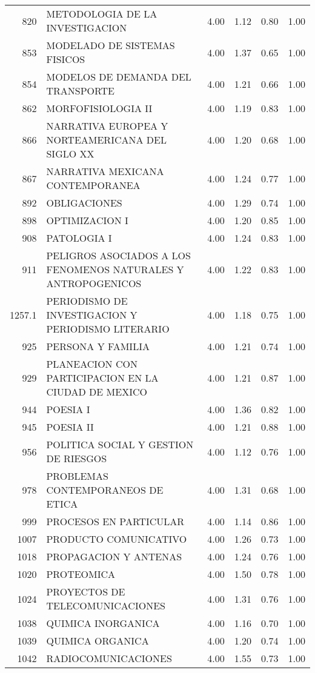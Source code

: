 \begin{table}[ht]
\begin{tabular}{rlrrrr}
  820 & METODOLOGIA DE LA INVESTIGACION & 4.00 & 1.12 & 0.80 & 1.00 \\ 
  853 & MODELADO DE SISTEMAS FISICOS & 4.00 & 1.37 & 0.65 & 1.00 \\ 
  854 & MODELOS DE DEMANDA DEL TRANSPORTE & 4.00 & 1.21 & 0.66 & 1.00 \\ 
  862 & MORFOFISIOLOGIA II & 4.00 & 1.19 & 0.83 & 1.00 \\ 
  866 & NARRATIVA EUROPEA Y NORTEAMERICANA DEL SIGLO XX & 4.00 & 1.20 & 0.68 & 1.00 \\ 
  867 & NARRATIVA MEXICANA CONTEMPORANEA & 4.00 & 1.24 & 0.77 & 1.00 \\ 
  892 & OBLIGACIONES & 4.00 & 1.29 & 0.74 & 1.00 \\ 
  898 & OPTIMIZACION I & 4.00 & 1.20 & 0.85 & 1.00 \\ 
  908 & PATOLOGIA I & 4.00 & 1.24 & 0.83 & 1.00 \\ 
  911 & PELIGROS ASOCIADOS A LOS FENOMENOS NATURALES Y ANTROPOGENICOS & 4.00 & 1.22 & 0.83 & 1.00 \\ 
  1257.1 & PERIODISMO DE INVESTIGACION Y PERIODISMO LITERARIO & 4.00 & 1.18 & 0.75 & 1.00 \\ 
  925 & PERSONA Y FAMILIA & 4.00 & 1.21 & 0.74 & 1.00 \\ 
  929 & PLANEACION CON PARTICIPACION EN LA CIUDAD DE MEXICO & 4.00 & 1.21 & 0.87 & 1.00 \\ 
  944 & POESIA I & 4.00 & 1.36 & 0.82 & 1.00 \\ 
  945 & POESIA II & 4.00 & 1.21 & 0.88 & 1.00 \\ 
  956 & POLITICA SOCIAL Y GESTION DE RIESGOS & 4.00 & 1.12 & 0.76 & 1.00 \\ 
  978 & PROBLEMAS CONTEMPORANEOS DE ETICA & 4.00 & 1.31 & 0.68 & 1.00 \\ 
  999 & PROCESOS EN PARTICULAR & 4.00 & 1.14 & 0.86 & 1.00 \\ 
  1007 & PRODUCTO COMUNICATIVO & 4.00 & 1.26 & 0.73 & 1.00 \\ 
  1018 & PROPAGACION Y ANTENAS & 4.00 & 1.24 & 0.76 & 1.00 \\ 
  1020 & PROTEOMICA & 4.00 & 1.50 & 0.78 & 1.00 \\ 
  1024 & PROYECTOS DE TELECOMUNICACIONES & 4.00 & 1.31 & 0.76 & 1.00 \\ 
  1038 & QUIMICA INORGANICA & 4.00 & 1.16 & 0.70 & 1.00 \\ 
  1039 & QUIMICA ORGANICA & 4.00 & 1.20 & 0.74 & 1.00 \\ 
  1042 & RADIOCOMUNICACIONES & 4.00 & 1.55 & 0.73 & 1.00 \\ 

\end{tabular}
\end{table}
